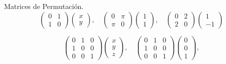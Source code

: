 \begin{ejercicio}
Matrices de Permutación.
$$
\left(\begin{array}{cc}
0&1 \\
1&0 
\end{array}\right)
\left(\begin{array}{c}
x \\
y
\end{array}\right) 
,\quad
\left(\begin{array}{cc}
0&\pi \\
\pi&0 
\end{array}\right)
\left(\begin{array}{c}
1 \\
1
\end{array}\right)
,\quad
\left(\begin{array}{cc}
0&2 \\
2&0 
\end{array}\right)
\left(\begin{array}{c}
1 \\
-1
\end{array}\right) 
$$

$$\left(\begin{array}{ccc}
0&1&0 \\
1&0&0 \\
0&0&1
\end{array}\right)
\left(\begin{array}{c}
x \\
y \\
z
\end{array}\right),
\quad
\left(\begin{array}{ccc}
0&1&0 \\
1&0&0 \\
0&0&1
\end{array}\right)
\left(\begin{array}{c}
0 \\
0 \\
1
\end{array}\right),
$$


\end{ejercicio}
